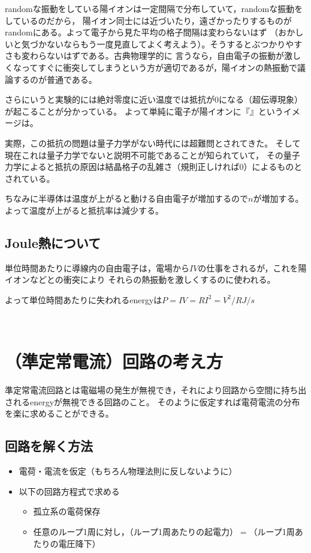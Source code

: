   randomな振動をしている陽イオンは一定間隔で分布していて，randomな振動をしているのだから，
  陽イオン同士には近づいたり，遠ざかったりするものがrandomにある。よって電子から見た平均の格子間隔は変わらないはず
  （おかしいと気づかないならもう一度見直してよく考えよう）。そうするとぶつかりやすさも変わらないはずである。古典物理学的に
  言うなら，自由電子の振動が激しくなってすぐに衝突してしまうという方が適切であるが，陽イオンの熱振動で議論するのが普通である。

  さらにいうと実験的には絶対零度に近い温度では抵抗が0になる（超伝導現象）が起こることが分かっている。
  よって単純に電子が陽イオンに『』というイメージは。

  実際，この抵抗の問題は量子力学がない時代には超難問とされてきた。
  そして現在これは量子力学でないと説明不可能であることが知られていて，
  その量子力学によると抵抗の原因は結晶格子の乱雑さ（規則正しければ0）によるものとされている。

  ちなみに半導体は温度が上がると動ける自由電子が増加するので$n$が増加する。よって温度が上がると抵抗率は減少する。

  \subsection{Joule熱について}

  単位時間あたりに導線内の自由電子は，電場から$IV$の仕事をされるが，これを陽イオンなどとの衝突により
  それらの熱振動を激しくするのに使われる。

  よって単位時間あたりに失われるenergyは$P=IV=RI^2=V^2/R\unit{J/s}$

  ﻿\section{（準定常電流）回路の考え方}

  準定常電流回路とは電磁場の発生が無視でき，それにより回路から空間に持ち出されるenergyが無視できる回路のこと。
  そのように仮定すれば電荷電流の分布を楽に求めることができる。

  \subsection{回路を解く方法}
  \begin{itemize}
   \item 電荷・電流を仮定（もちろん物理法則に反しないように）
   \item 以下の回路方程式で求める
	 \begin{itemize}
	  \item 孤立系の電荷保存
	  \item 任意のループ1周に対し，（ループ1周あたりの起電力）${}={}$（ループ1周あたりの電圧降下）
	 \end{itemize}
  \end{itemize}

